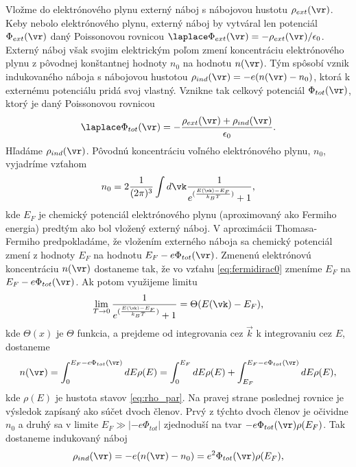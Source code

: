 Vložme do elektrónového plynu externý náboj s nábojovou hustotu $\rho_{ext}(\vr)$. Keby nebolo elektrónového plynu, externý náboj by vytváral len potenciál
 $\Phi_{ext}(\vr)$ daný Poissonovou rovnicou $\laplace \Phi_{ext}(\vr)=-\rho_{ext}(\vr)/\epsilon_0$. Externý náboj však svojim elektrickým poľom zmení koncentráciu elektrónového plynu z pôvodnej konštantnej hodnoty $n_0$ na
hodnotu $n(\vr)$. Tým spôsobí vznik indukovaného náboja s nábojovou hustotou $\rho_{ind}(\vr) =-e(n(\vr)-n_0)$, ktorá k externému potenciálu pridá svoj vlastný. Vznikne tak celkový potenciál $\Phi_{tot}(\vr)$, ktorý je daný
Poissonovou rovnicou 
\begin{equation}
 \label{eq:poistot}
 \laplace \Phi_{tot}(\vr)=-\frac{\rho_{ext}(\vr)+\rho_{ind}(\vr)}{\epsilon_0} \text{.}
\end{equation}
Hľadáme $\rho_{ind}(\vr)$. Pôvodnú koncentráciu voľného elektrónového plynu, $n_0$, vyjadríme vzťahom
\begin{equation}
 \label{eq:fermidirac0}
 n_0=2\frac{1}{(2\pi)^3}\int d\vk \frac{1}{e^{(\frac{E(\vk)-E_F}{k_BT})}+1} \text{,}
\end{equation}
kde $E_F$ je chemický potenciál elektrónového plynu (aproximovaný ako Fermiho energia) predtým ako bol vložený externý náboj. V aproximácii Thomasa-Fermiho predpokladáme, že vložením externého náboja sa chemický potenciál
zmení z hodnoty $E_F$ na hodnotu $E_F-e\Phi_{tot}(\vr)$. Zmenenú elektrónovú koncentráciu $n(\vr)$ dostaneme tak, že vo vzťahu \eqref{eq:fermidirac0} zmeníme $E_F$ na $E_F-e\Phi_{tot}(\vr)$. Ak potom využijeme limitu
 \begin{equation}
  \label{eq:limLT}
  \lim_{T\to 0} \frac{1}{e^{(\frac{E(\vk)-E_F}{k_BT})}+1}=\Theta(E(\vk)-E_F) \text{,}
 \end{equation}
 kde $\Theta(x)$ je $\Theta$ funkcia, a prejdeme od integrovania cez $\vec k$ k integrovaniu cez $E$, dostaneme
 \begin{equation}
  \label{eq:nr}
  n(\vr)=\int_{0}^{E_F-e\Phi_{tot}{(\vr)}}dE \rho(E)=\int_{0}^{E_F}dE \rho(E) + \int_{E_F}^{E_F-e\Phi_{tot}{(\vr)}}dE \rho(E) \text{,}
 \end{equation}
 kde $\rho(E)$ je hustota stavov \eqref{eq:rho_par}. Na pravej strane poslednej rovnice je výsledok zapísaný ako súčet dvoch členov. Prvý z týchto dvoch členov
 je očividne $n_0$ a druhý sa v limite $E_F \gg |-e\Phi_{tot}|$ zjednoduší na tvar $-e\Phi_{tot}(\vr)\rho(E_F)$.
Tak dostaneme indukovaný náboj 
 \begin{equation}
  \label{eq:n_ind_final}
\rho_{ind}(\vr)=-e(n(\vr)-n_0)=e^2\Phi_{tot}(\vr)\rho(E_F) \text{,}
 \end{equation}
